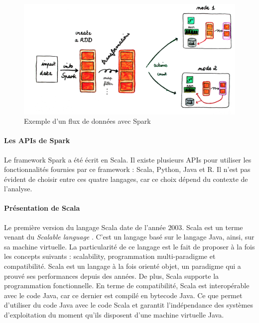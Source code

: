\begin{figure}[H]
	\centering
	\captionsetup{justification= centering}
	\includegraphics[width=0.7\linewidth]{illustrations/global_view_rdd}
	\caption{Exemple d'un flux de données avec Spark}
	\label{fig:globalviewrdd}
\end{figure}



\paragraph{Les APIs de Spark}

Le framework Spark a été écrit en Scala.  Il existe plusieurs APIs pour utiliser les fonctionnalités fournies par ce framework : Scala, Python, Java et R. Il n'est pas évident de choisir entre ces quatre langages, car ce choix dépend du contexte de l'analyse. 





\paragraph{Présentation de Scala} \label{scala-presentation}


Le première version du langage Scala date de l'année $2003$. Scala  est un terme venant du \textit{ Scalable language }. C'est un langage basé sur le langage Java, ainsi, sur sa machine virtuelle. La particularité de ce langage est le fait de proposer à la fois les concepts suivants : scalability, programmation multi-paradigme et compatibilité.  
Scala est un langage à la fois orienté objet, un paradigme qui a prouvé ses performances depuis des années. De plus, Scala supporte la programmation fonctionnelle. En terme de compatibilité, Scala est interopérable avec le code Java, car ce dernier est compilé en bytecode Java. Ce que permet d'utiliser du code Java avec le code Scala et garantit l'indépendance des systèmes d'exploitation du moment qu'ils disposent d'une machine virtuelle Java.

